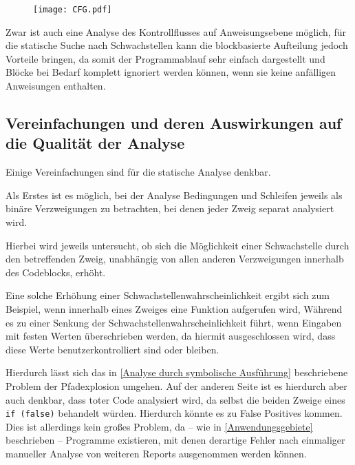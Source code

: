             \begin{figure}[htp]
                \centering%
                \texttt{[image: CFG.pdf]}
                \label{fig:CFG des C-Programms}
            \end{figure}

            Zwar ist auch eine Analyse des Kontrollflusses auf Anweisungsebene möglich,
            für die statische Suche nach Schwachstellen kann die blockbasierte Aufteilung jedoch Vorteile bringen,
            da somit der Programmablauf sehr einfach dargestellt und
            Blöcke bei Bedarf komplett ignoriert werden können,
            wenn sie keine anfälligen Anweisungen enthalten.

        \subsection{Vereinfachungen und deren Auswirkungen auf die Qualität der Analyse}\label{Vereinfachungen und deren Auswirkungen auf die Qualität der Analyse}
            Einige Vereinfachungen sind für die statische Analyse denkbar.

            Als Erstes ist es möglich,
            bei der Analyse Bedingungen und
            Schleifen jeweils als binäre Verzweigungen zu betrachten,
            bei denen jeder Zweig separat analysiert wird.

            Hierbei wird jeweils untersucht,
            ob sich die Möglichkeit einer Schwachstelle durch den betreffenden Zweig,
            unabhängig von allen anderen Verzweigungen innerhalb des Codeblocks,
            erhöht.

            Eine solche Erhöhung einer Schwachstellenwahrscheinlichkeit ergibt sich zum Beispiel,
            wenn innerhalb eines Zweiges eine Funktion aufgerufen wird,
            Während es zu einer Senkung der Schwachstellenwahrscheinlichkeit führt,
            wenn Eingaben mit festen Werten überschrieben werden,
            da hiermit ausgeschlossen wird,
            dass diese Werte benutzerkontrolliert sind oder
            bleiben.

            Hierdurch lässt sich das in
            \vref{Analyse durch symbolische Ausführung} beschriebene Problem der Pfadexplosion umgehen.
            Auf der anderen Seite ist es hierdurch aber auch denkbar,
            dass toter Code analysiert wird,
            da selbst die beiden Zweige eines
            \lstinline{if (false)} behandelt würden.
            Hierdurch könnte es zu False Positives kommen.
            Dies ist allerdings kein großes Problem,
            da
            --
            wie in
            \vref{Anwendungsgebiete} beschrieben
            -- Programme existieren,
            mit denen derartige Fehler nach einmaliger manueller Analyse von weiteren Reports ausgenommen werden können.

